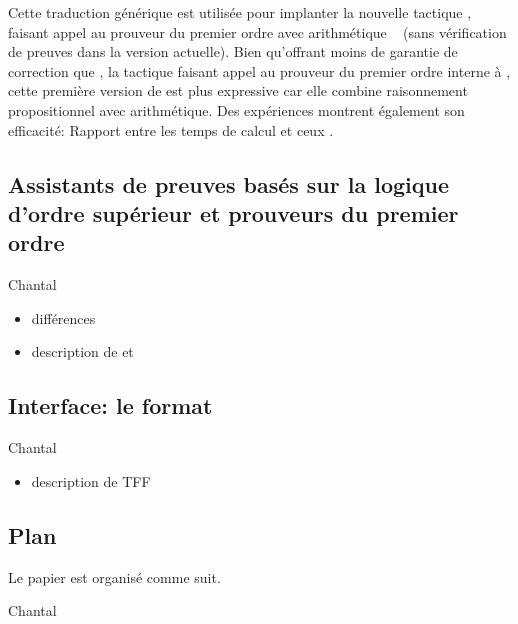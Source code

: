 Cette traduction générique est utilisée pour implanter la nouvelle
tactique \beagletac, faisant appel au prouveur du premier ordre avec
arithmétique \beagle~\cite{DBLP:conf/cade/BaumgartnerW13} (sans
vérification de preuves dans la version actuelle). Bien qu'offrant moins
de garantie de correction que \metistac, la tactique faisant appel au
prouveur du premier ordre interne à \holfour, cette première version de
\beagletac est plus expressive car elle combine raisonnement
propositionnel avec arithmétique. Des expériences montrent également son
efficacité: \todo Rapport entre les temps de calcul \beagletac et ceux
\metistac.


\subsection{Assistants de preuves basés sur la logique d'ordre supérieur
et prouveurs du premier ordre}

\todo Chantal

\begin{itemize}
\item différences
\item description de \holfour et \beagle
\end{itemize}


\subsection{Interface: le format \tff}

\todo Chantal

\begin{itemize}
\item description de TFF
\end{itemize}


\subsection{Plan}

Le papier est organisé comme suit.

\todo Chantal
